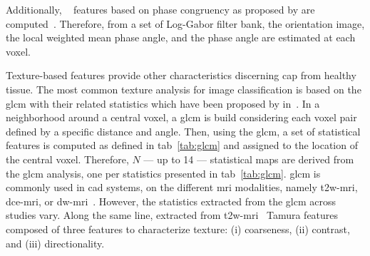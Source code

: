 \begin{enumerate}[leftmargin=*]
Additionally, \citeauthor{Lemaitre2016thesis}~\cite{Lemaitre2016thesis}
features based on phase congruency as proposed by\citeauthor{kovesi1999image}
are computed~\cite{kovesi1999image}.
Therefore, from a set of Log-Gabor filter bank, the orientation image, the
local weighted mean phase angle, and the phase angle are estimated at each
voxel.

Texture-based features provide other characteristics discerning \ac{cap} from
healthy tissue.
The most common texture analysis for image classification is based on the
\ac{glcm} with their related statistics which have been proposed by
\citeauthor{Haralick1973} in~\cite{Haralick1973}.
In a neighborhood around a central voxel, a \ac{glcm} is build considering each
voxel pair defined by a specific distance and angle.
Then, using the \ac{glcm}, a set of statistical features is computed as defined
in \acs{tab}~\ref{tab:glcm} and assigned to the location of the central voxel.
Therefore, $N$ --- up to 14 --- statistical maps are derived from the \ac{glcm}
analysis, one per statistics presented in \acs{tab}~\ref{tab:glcm}.
\ac{glcm} is commonly used in \ac{cad} systems, on the different \ac{mri}
modalities, namely \ac{t2w}-\ac{mri}, \ac{dce}-\ac{mri}, or
\ac{dw}-\ac{mri}~\cite{Antic2013,Niaf2011,Niaf2012,Tiwari2009a,Tiwari2010,Tiwari2013,Viswanath2008,Viswanath2009,Viswanath2011,Viswanath2012,trigui2016classification,rampun2015computer,rampun2016computer,rampun2016quantitative,cameron2014multiparametric,cameron2016maps,khalvati2015automated,chung2015prostate,lehaire2014computer,Lemaitre2016thesis}.
However, the statistics extracted from the \ac{glcm} across studies vary.
Along the same line, \citeauthor{rampun2016computer} extracted from
\ac{t2w}-\ac{mri}~\cite{rampun2016computer,rampun2015computer} Tamura
features~\cite{tamura1978textural} composed of three features to characterize
texture: (i) coarseness, (ii) contrast, and (iii) directionality.


\end{enumerate}
